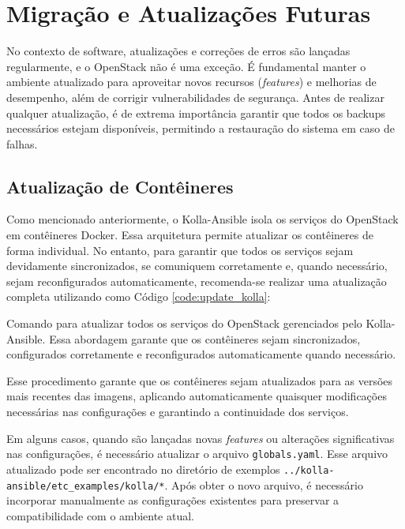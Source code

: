 \section{Migração e Atualizações Futuras}

No contexto de software, atualizações e correções de erros são lançadas regularmente, e o OpenStack não é uma exceção. É fundamental manter o ambiente atualizado para aproveitar novos recursos (\textit{features}) e melhorias de desempenho, além de corrigir vulnerabilidades de segurança. Antes de realizar qualquer atualização, é de extrema importância garantir que todos os backups necessários estejam disponíveis, permitindo a restauração do sistema em caso de falhas.

\subsection{Atualização de Contêineres}

Como mencionado anteriormente, o Kolla-Ansible isola os serviços do OpenStack em contêineres Docker. Essa arquitetura permite atualizar os contêineres de forma individual. No entanto, para garantir que todos os serviços sejam devidamente sincronizados, se comuniquem corretamente e, quando necessário, sejam reconfigurados automaticamente, recomenda-se realizar uma atualização completa utilizando como Código \ref{code:update_kolla}:

\begin{listing}[h!]
    \noindent{}  
  \caption{Comando para atualizar todos os serviços do OpenStack gerenciados pelo Kolla-Ansible. Essa abordagem garante que os contêineres sejam sincronizados, configurados corretamente e reconfigurados automaticamente quando necessário.}
  \label{code:update_kolla}
\end{listing}

Esse procedimento garante que os contêineres sejam atualizados para as versões mais recentes das imagens, aplicando automaticamente quaisquer modificações necessárias nas configurações e garantindo a continuidade dos serviços.

Em alguns casos, quando são lançadas novas \textit{features} ou alterações significativas nas configurações, é necessário atualizar o arquivo \texttt{globals.yaml}. Esse arquivo atualizado pode ser encontrado no diretório de exemplos \texttt{../kolla-ansible/etc\_examples/kolla/*}. Após obter o novo arquivo, é necessário incorporar manualmente as configurações existentes para preservar a compatibilidade com o ambiente atual.


